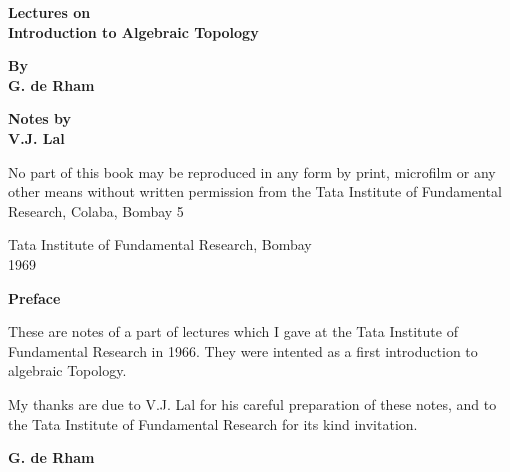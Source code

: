 \thispagestyle{empty}
\begin{center}
{\large\bf Lectures on}\\ 
{\Large\bf Introduction to Algebraic Topology}
\vfill

{\large\bf By}\\
{\Large\bf G. de Rham}\\
\vfill

{\large\bf Notes by}\\
{\Large\bf V.J. Lal}
\vfill

\parbox{0.7\textwidth}{No part of this book may be reproduced
in any form by print, microfilm or any other means without written permission
from the Tata Institute of Fundamental Research, Colaba, Bombay 5}
\vfill

Tata Institute of Fundamental Research, Bombay\\
1969
\end{center}

\eject
\thispagestyle{empty}

\begin{center}
{\Large\textbf{Preface}}
\end{center}

These are notes of a part of lectures which I gave at the Tata
Institute of Fundamental Research in 1966. They were intented as a
first introduction to algebraic Topology.

\medskip

My thanks are due to V.J. Lal for his careful preparation of these
notes, and to the Tata Institute of Fundamental Research for its kind
invitation.
\bigskip

\hfill{{\large\bf G. de Rham}}

\vfill\eject
